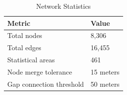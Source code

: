 \begin{table}[H]
\centering
\caption{Network Statistics}
\label{tab:network_stats}
\begin{tabular}{@{}ll@{}}
\toprule
\textbf{Metric} & \textbf{Value} \\
\midrule
Total nodes & 8,306 \\
Total edges & 16,455 \\
Statistical areas & 461 \\
Node merge tolerance & 15 meters \\
Gap connection threshold & 50 meters \\
\bottomrule
\end{tabular}
\end{table}

